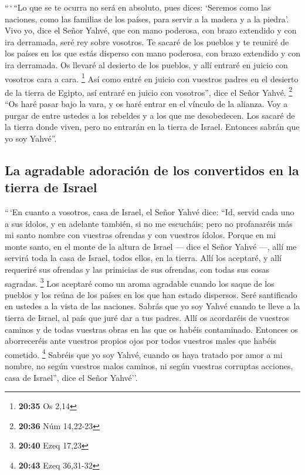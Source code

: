  ``\,`\,``Lo que se te ocurra no será en absoluto, pues
dices: `Seremos como las naciones, como las familias de los países, para
servir a la madera y a la piedra'.  Vivo yo, dice el
Señor Yahvé, que con mano poderosa, con brazo extendido y con ira
derramada, seré rey sobre vosotros.  Te sacaré de los
pueblos y te reuniré de los países en los que estás disperso con mano
poderosa, con brazo extendido y con ira derramada.  Os
llevaré al desierto de los pueblos, y allí entraré en juicio con
vosotros cara a cara. \footnote{\textbf{20:35} Os 2,14} 
Así como entré en juicio con vuestros padres en el desierto de la tierra
de Egipto, así entraré en juicio con vosotros'', dice el Señor Yahvé.
\footnote{\textbf{20:36} Núm 14,22-23}  ``Os haré pasar
bajo la vara, y os haré entrar en el vínculo de la alianza.
 Voy a purgar de entre ustedes a los rebeldes y a los que
me desobedecen. Los sacaré de la tierra donde viven, pero no entrarán en
la tierra de Israel. Entonces sabrán que yo soy Yahvé''.

\hypertarget{la-agradable-adoraciuxf3n-de-los-convertidos-en-la-tierra-de-israel}{%
\subsection{La agradable adoración de los convertidos en la tierra de
Israel}\label{la-agradable-adoraciuxf3n-de-los-convertidos-en-la-tierra-de-israel}}

 ``\,`En cuanto a vosotros, casa de Israel, el Señor
Yahvé dice: ``Id, servid cada uno a sus ídolos, y en adelante también,
si no me escucháis; pero no profanaréis más mi santo nombre con vuestras
ofrendas y con vuestros ídolos.  Porque en mi monte
santo, en el monte de la altura de Israel --- dice el Señor Yahvé ---,
allí me servirá toda la casa de Israel, todos ellos, en la tierra. Allí
los aceptaré, y allí requeriré sus ofrendas y las primicias de sus
ofrendas, con todas sus cosas sagradas. \footnote{\textbf{20:40} Ezeq
  17,23}  Los aceptaré como un aroma agradable cuando los
saque de los pueblos y los reúna de los países en los que han estado
dispersos. Seré santificado en ustedes a la vista de las naciones.
 Sabrás que yo soy Yahvé cuando te lleve a la tierra de
Israel, al país que juré dar a tus padres.  Allí os
acordaréis de vuestros caminos y de todas vuestras obras en las que os
habéis contaminado. Entonces os aborreceréis ante vuestros propios ojos
por todos vuestros males que habéis cometido. \footnote{\textbf{20:43}
  Ezeq 36,31-32}  Sabréis que yo soy Yahvé, cuando os
haya tratado por amor a mi nombre, no según vuestros malos caminos, ni
según vuestras corruptas acciones, casa de Israel'', dice el Señor
Yahvé''.

